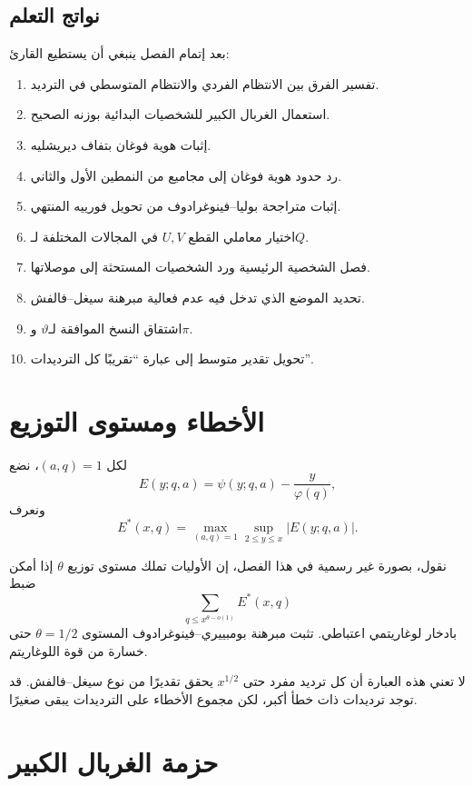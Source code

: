 \subsection{نواتج التعلم}

بعد إتمام الفصل ينبغي أن يستطيع القارئ:
\begin{enumerate}
  \item تفسير الفرق بين الانتظام الفردي والانتظام المتوسطي في الترديد.
  \item استعمال الغربال الكبير للشخصيات البدائية بوزنه الصحيح.
  \item إثبات هوية فوغان بتفاف ديريشليه.
  \item رد حدود هوية فوغان إلى مجاميع من النمطين الأول والثاني.
  \item إثبات متراجحة بوليا--فينوغرادوف من تحويل فورييه المنتهي.
  \item اختيار معاملي القطع \(U,V\) في المجالات المختلفة لـ\(Q\).
  \item فصل الشخصية الرئيسية ورد الشخصيات المستحثة إلى موصلاتها.
  \item تحديد الموضع الذي تدخل فيه عدم فعالية مبرهنة سيغل--فالفش.
  \item اشتقاق النسخ الموافقة لـ\(\vartheta\) و\(\pi\).
  \item تحويل تقدير متوسط إلى عبارة ``تقريبًا كل الترديدات''.
\end{enumerate}

\section{الأخطاء ومستوى التوزيع}

لكل \((a,q)=1\)، نضع
\[
E(y;q,a)
=
\psi(y;q,a)-\frac{y}{\varphi(q)},
\]
ونعرف
\[
E^*(x,q)
=
\max_{(a,q)=1}
\sup_{2\le y\le x}|E(y;q,a)|.
\]

\begin{definition}
نقول، بصورة غير رسمية في هذا الفصل، إن الأوليات تملك مستوى توزيع
\(\theta\) إذا أمكن ضبط
\[
\sum_{q\le x^{\theta-o(1)}}E^*(x,q)
\]
بادخار لوغاريتمي اعتباطي. تثبت مبرهنة بومبييري--فينوغرادوف المستوى
\(\theta=1/2\) حتى خسارة من قوة اللوغاريتم.
\end{definition}

لا تعني هذه العبارة أن كل ترديد مفرد حتى \(x^{1/2}\) يحقق تقديرًا من نوع
سيغل--فالفش. قد توجد ترديدات ذات خطأ أكبر، لكن مجموع الأخطاء على الترديدات
يبقى صغيرًا.

\section{حزمة الغربال الكبير}

